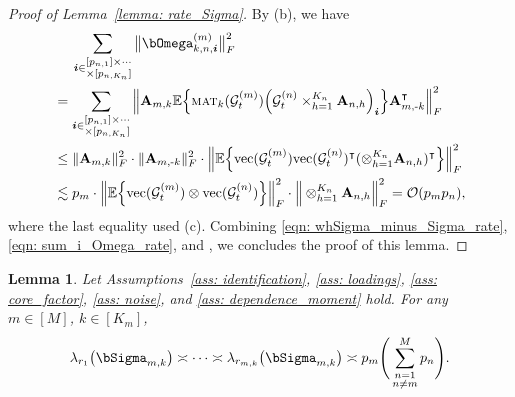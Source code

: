 \documentclass[aos]{imsart}
\theoremstyle{plain}
\newtheorem{lemma}[theorem]{Lemma}
\theoremstyle{definition}
\def\mat{\textnormal{\textsc{mat}}}
\def\E{\mathbb{E}}
\def\cG{\mathcal{G}} \def\cH{\boldsymbol{\mathcal{H}}} \def\cI{\mathcal{I}}
\def\cO{\mathcal{O}}
\def\bi{\boldsymbol{i}}
\def\bA{\mathbf{A}}
\def\trans{\intercal}
\def\vec{\mathrm{vec}}
\begin{document}
\begin{proof}[Proof of Lemma~\ref{lemma: rate_Sigma}]
By (b), we have
\begin{align}
    &\;\quad
    \sum_{\bi \in \substack{[p_{n,1}] \times \cdots\\ \times[p_{n,K_n}] }} \big\| \bOmega_{k,n,\bi}^{(m)} \big\|_F^2 \notag \\
    &=
    \sum_{\bi \in \substack{[p_{n,1}] \times \cdots\\ \times[p_{n,K_n}] }} \Big\| \bA_{m,k} \E\Big\{ \mat_k(\cG_t^{(m)}) \Big( \cG_t^{(n)} \times_{h=1}^{K_n} \bA_{n,h} \Big)_{\bi} \Big\} \bA_{m,\text{-}k}^\trans \Big\|_F^2 \notag \\
    &\leq
    \|\bA_{m,k}\|_F^2 \cdot \|\bA_{m,\text{-}k}\|_F^2 \cdot \Big\| \E\Big\{ \vec(\cG_t^{(m)}) \vec(\cG_t^{(n)})^\trans (\otimes_{h=1}^{K_n} \bA_{n,h})^\trans \Big\} \Big\|_F^2 \notag \\
    &\lesssim
    p_m \cdot \Big\| \E\Big\{ \vec(\cG_t^{(m)}) \otimes \vec(\cG_t^{(n)}) \Big\} \Big\|_F^2 \cdot \Big\| \otimes_{h=1}^{K_n} \bA_{n,h} \Big\|_F^2
    = \cO(p_m p_n) ,
    \label{eqn: sum_i_Omega_rate}
\end{align}
where the last equality used (c). Combining \eqref{eqn: whSigma_minus_Sigma_rate}, \eqref{eqn: sum_i_Omega_rate}, and , we concludes the proof of this lemma.
\end{proof}




\begin{lemma}\label{lemma: eigenvalue_Sigma}
Let Assumptions~\ref{ass: identification}, \ref{ass: loadings}, \ref{ass: core_factor}, \ref{ass: noise}, and \ref{ass: dependence_moment} hold. For any $m\in[M]$, $k\in[K_m]$,
\begin{align*}
    \lambda_{r_1}\big( \bSigma_{m,k} \big) \asymp \dots \asymp \lambda_{r_{m,k}}\big( \bSigma_{m,k} \big) \asymp p_m \Bigg( \sum_{\substack{n=1\\ n\neq m}}^M p_n \Bigg) .
\end{align*}
\end{lemma}
\end{document}
